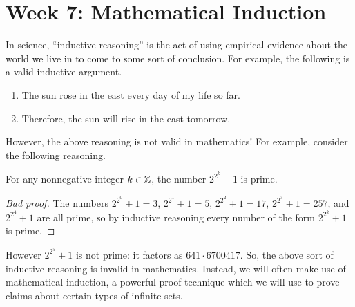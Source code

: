 \documentclass[../main.tex]{subfiles}
\begin{document}
\section{Week 7: Mathematical Induction}
In science, ``inductive reasoning'' is the act of using empirical evidence about the world we live in to come to some sort of conclusion. For example, the following is a valid inductive argument.
\begin{enumerate}
    \item The sun rose in the east every day of my life so far.
    \item Therefore, the sun will rise in the east tomorrow.
\end{enumerate}
However, the above reasoning is not valid in mathematics! For example, consider the following reasoning.
\begin{badtheorem}
    For any nonnegative integer $k \in \mathbb Z$, the number $2^{2^k} + 1$ is prime.
\end{badtheorem}
\begin{proof}[Bad proof]
    The numbers $2^{2^0} + 1 = 3$, $2^{2^1} + 1 = 5$, $2^{2^2} + 1 = 17$, $2^{2^3} + 1 = 257$, and $2^{2^4} + 1$ are all prime, so by inductive reasoning every number of the form $2^{2^k} + 1$ is prime.
\end{proof}
However $2^{2^5} + 1$ is not prime: it factors as $641 \cdot 6700417$. So, the above sort of inductive reasoning is invalid in mathematics. Instead, we will often make use of mathematical induction, a powerful proof technique which we will use to prove claims about certain types of infinite sets.
\end{document}
